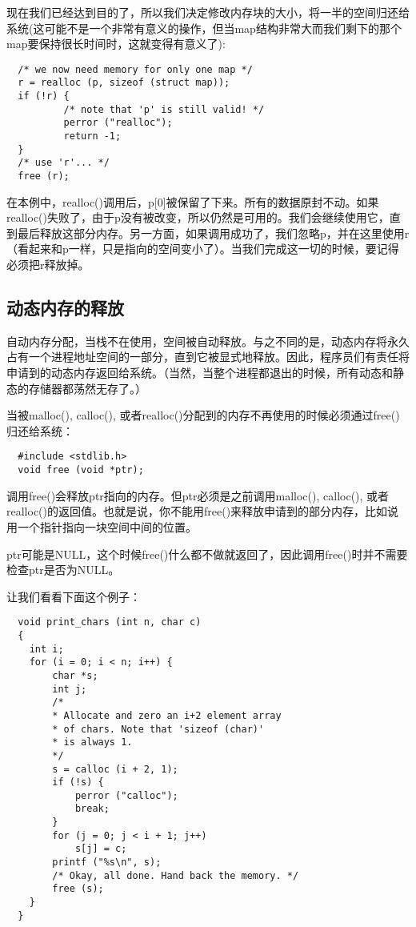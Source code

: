 现在我们已经达到目的了，所以我们决定修改内存块的大小，将一半的空间归还给系统(这可能不是一个非常有意义的操作，但当map结构非常大而我们剩下的那个map要保持很长时间时，这就变得有意义了):

\begin{lstlisting}
  /* we now need memory for only one map */
  r = realloc (p, sizeof (struct map));
  if (!r) {
          /* note that 'p' is still valid! */
          perror ("realloc");
          return -1;
  }
  /* use 'r'... */
  free (r);
\end{lstlisting}

在本例中，realloc()调用后，p[0]被保留了下来。所有的数据原封不动。如果realloc()失败了，由于p没有被改变，所以仍然是可用的。我们会继续使用它，直到最后释放这部分内存。另一方面，如果调用成功了，我们忽略p，并在这里使用r（看起来和p一样，只是指向的空间变小了）。当我们完成这一切的时候，要记得必须把r释放掉。 

\subsection{动态内存的释放}

自动内存分配，当栈不在使用，空间被自动释放。与之不同的是，动态内存将永久占有一个进程地址空间的一部分，直到它被显式地释放。因此，程序员们有责任将申请到的动态内存返回给系统。（当然，当整个进程都退出的时候，所有动态和静态的存储器都荡然无存了。）

当被malloc(), calloc(), 或者realloc()分配到的内存不再使用的时候必须通过free()归还给系统： 

\begin{lstlisting}
  #include <stdlib.h>
  void free (void *ptr);
\end{lstlisting}

调用free()会释放ptr指向的内存。但ptr必须是之前调用malloc(), calloc(), 或者realloc()的返回值。也就是说，你不能用free()来释放申请到的部分内存，比如说用一个指针指向一块空间中间的位置。

ptr可能是NULL，这个时候free()什么都不做就返回了，因此调用free()时并不需要检查ptr是否为NULL。

让我们看看下面这个例子： 

\begin{lstlisting}
  void print_chars (int n, char c)
  {
    int i;
    for (i = 0; i < n; i++) {
        char *s;
        int j;
        /*
        * Allocate and zero an i+2 element array
        * of chars. Note that 'sizeof (char)'
        * is always 1.
        */
        s = calloc (i + 2, 1);
        if (!s) {
            perror ("calloc");
            break;
        }
        for (j = 0; j < i + 1; j++)
            s[j] = c;
        printf ("%s\n", s);
        /* Okay, all done. Hand back the memory. */
        free (s);
    }
  }
\end{lstlisting}

